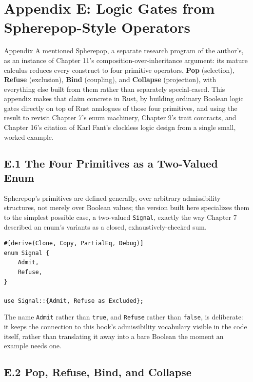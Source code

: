 \documentclass[11pt]{book}
\begin{document}
\clearpage

\chapter[Logic Gates from Spherepop-Style Operators]{Appendix E: Logic Gates from Spherepop-Style Operators}

Appendix A mentioned Spherepop, a separate research program of the author's, as an instance of Chapter 11's composition-over-inheritance argument: its mature calculus reduces every construct to four primitive operators, \textbf{Pop} (selection), \textbf{Refuse} (exclusion), \textbf{Bind} (coupling), and \textbf{Collapse} (projection), with everything else built from them rather than separately special-cased. This appendix makes that claim concrete in Rust, by building ordinary Boolean logic gates directly on top of Rust analogues of those four primitives, and using the result to revisit Chapter 7's enum machinery, Chapter 9's trait contracts, and Chapter 16's citation of Karl Fant's clockless logic design from a single small, worked example.

\section*{E.1 The Four Primitives as a Two-Valued Enum}

Spherepop's primitives are defined generally, over arbitrary admissibility structures, not merely over Boolean values; the version built here specializes them to the simplest possible case, a two-valued \texttt{Signal}, exactly the way Chapter 7 described an enum's variants as a closed, exhaustively-checked sum.

\begin{lstlisting}
#[derive(Clone, Copy, PartialEq, Debug)]
enum Signal {
    Admit,
    Refuse,
}

use Signal::{Admit, Refuse as Excluded};
\end{lstlisting}

The name \texttt{Admit} rather than \texttt{true}, and \texttt{Refuse} rather than \texttt{false}, is deliberate: it keeps the connection to this book's admissibility vocabulary visible in the code itself, rather than translating it away into a bare Boolean the moment an example needs one.

\section*{E.2 Pop, Refuse, Bind, and Collapse}
\end{document}
